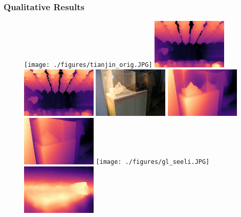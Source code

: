 \documentclass[12pt]{beamer}
\begin{document}
\begin{frame}
    \frametitle{Qualitative Results}
    
    \begin{figure}
        \centering
        \texttt{[image: ./figures/tianjin\_orig.JPG]}
        \includegraphics[width=0.32\textwidth]{./figures/tianjin_depthmap_v1-small.png}
        \includegraphics[width=0.32\textwidth]{./figures/tianjin_depthmap_v2-small.png}
        \includegraphics[width=0.32\textwidth]{./figures/schoggimatterhorn.JPG}
        \includegraphics[width=0.32\textwidth]{./figures/schoggimatterhorn_v1-small.png}
        \includegraphics[width=0.32\textwidth]{./figures/schoggimatterhorn_v2-small.png}
        \texttt{[image: ./figures/gl\_seeli.JPG]}
        \includegraphics[width=0.32\textwidth]{./figures/gl_seeli_v1-small.png}

\end{figure}
\end{frame}
\end{document}
